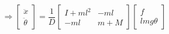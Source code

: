 \documentclass{article}
\begin{document}
\thispagestyle{empty}
$$
\Rightarrow\begin{bmatrix}\ddot{x}\\ \ddot{\theta}\end{bmatrix} = \frac{1}{D}\begin{bmatrix}I+ml^2 & -ml \\ -ml & m+M\end{bmatrix}\begin{bmatrix}f\\ lmg\theta\end{bmatrix}
$$
\end{document}

